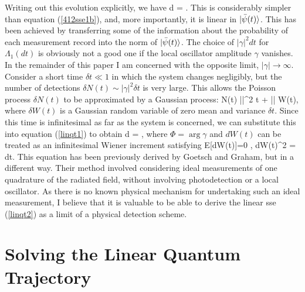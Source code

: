 Writing out this evolution explicitly, we have
\beq \label{linqt1}
d =  .
\eeq
This is considerably simpler than equation (\ref{412sse1b}), and, more importantly,
it is linear in $| {\bar\psi(t)} \rangle$. This has been achieved by transferring some
of the information about the probability of each measurement record into the norm
of $| {\bar\psi(t)} \rangle$. The choice of
$|\gamma|^2 dt$ for $\Lambda_1(dt)$ is obviously not a good one if the local
oscillator amplitude $\gamma$ vanishes. In the remainder of this paper I am concerned
with the opposite limit, $|\gamma| \to \infty$. Consider a short time $\delta t \ll
1$ in which the system changes negligibly, but the number of detections $\delta N(t)
\sim |\gamma|^2 \delta t$ is very large. This allows the Poisson process $\delta
N(t)$  to be approximated by a Gaussian process:  
\beq \delta N(t) \simeq |\gamma|^2 \delta t +
|\gamma| \delta W(t), \eeq
where $\delta W(t)$ is a Gaussian random variable of zero mean and variance $\delta t$. Since
this time is infinitesimal as far as the system is concerned, we can substitute this
into equation (\ref{linqt1}) to obtain
 \beq \label{linqt2}
d =  ,
\eeq
where $\Phi = \arg \gamma$ and $dW(t)$ can be treated as an infinitesimal Wiener
increment \cite{Gar85} satisfying
\beq
{\rm E}[dW(t)]=0 \;,\;\; dW(t)^2 = dt.
\eeq
This equation has been previously derived by Goetsch and Graham, but in a
different way. Their method involved considering ideal measurements of one
quadrature of the radiated field, without involving photodetection or a local
oscillator. As there is no known physical mechanism for undertaking such an ideal
measurement, I believe that it is valuable to be able to derive the linear {\sc sse}
(\ref{linqt2}) as a limit of a physical detection scheme.

\section{Solving the Linear Quantum Trajectory}

